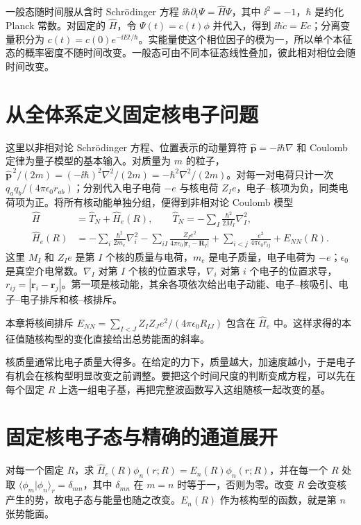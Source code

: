 一般态随时间服从含时 Schrödinger 方程 $\ii\hbar\partial_t\Psi=\hat H\Psi$，其中 $\ii^2=-1$，$\hbar$ 是约化 Planck 常数。对固定的 $\hat H$，令 $\Psi(t)=c(t)\phi$ 并代入，得到 $\ii\hbar\dot c=Ec$；分离变量积分为 $c(t)=c(0)e^{-\ii Et/\hbar}$。实能量使这个相位因子的模为一，所以单个本征态的概率密度不随时间改变。一般态可由不同本征态线性叠加，彼此相对相位会随时间改变。

\section{从全体系定义固定核电子问题}
这里以非相对论 Schrödinger 方程、位置表示的动量算符 $\hat{\bm p}=-\ii\hbar\nabla$ 和 Coulomb 定律为量子模型的基本输入。对质量为 $m$ 的粒子，$\hat{\bm p}^{\,2}/(2m)=(-\ii\hbar)^2\nabla^2/(2m)=-\hbar^2\nabla^2/(2m)$。对每一对电荷只计一次 $q_aq_b/(4\pi\epsilon_0r_{ab})$；分别代入电子电荷 $-e$ 与核电荷 $Z_Ie$，电子--核项为负，同类电荷项为正。将所有核动能单独分组，便得到非相对论 Coulomb 模型
\begin{align}
\hat H&=\hat T_N+\hat H_e(R),\qquad \hat T_N=-\sum_I\frac{\hbar^2}{2M_I}\nabla_I^2,\\
\hat H_e(R)&=-\sum_i\frac{\hbar^2}{2m_e}\nabla_i^2
-\sum_{iI}\frac{Z_I e^2}{4\pi\epsilon_0|\bm r_i-\bm R_I|}
+\sum_{i<j}\frac{e^2}{4\pi\epsilon_0r_{ij}}+E_{NN}(R).
\end{align}
这里 $M_I$ 和 $Z_Ie$ 是第 $I$ 个核的质量与电荷，$m_e$ 是电子质量，电子电荷为 $-e$；$\epsilon_0$ 是真空介电常数。$\nabla_I$ 对第 $I$ 个核的位置求导，$\nabla_i$ 对第 $i$ 个电子的位置求导，$r_{ij}=|\bm r_i-\bm r_j|$。第一项是核动能，其余各项依次给出电子动能、电子--核吸引、电子--电子排斥和核--核排斥。

本章将核间排斥 $E_{NN}=\sum_{I<J}Z_IZ_Je^2/(4\pi\epsilon_0R_{IJ})$ 包含在 $\hat H_e$ 中。这样求得的本征值随核构型的变化直接给出总势能面的斜率。

核质量通常比电子质量大得多。在给定的力下，质量越大，加速度越小，于是电子有机会在核构型明显改变之前调整。要把这个时间尺度的判断变成方程，可以先在每个固定 $R$ 上选一组电子基，再把完整波函数写入这组随核一起改变的基。

\section{固定核电子态与精确的通道展开}
对每一个固定 $R$，求 $\hat H_e(R)\phi_n(r;R)=E_n(R)\phi_n(r;R)$，并在每一个 $R$ 处取 $\langle\phi_m|\phi_n\rangle_r=\delta_{mn}$，其中 $\delta_{mn}$ 在 $m=n$ 时等于一，否则为零。改变 $R$ 会改变核产生的势，故电子态与能量也随之改变。$E_n(R)$ 作为核构型的函数，就是第 $n$ 张势能面。

